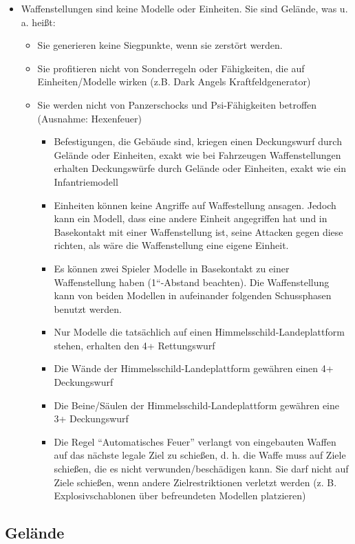 \begin{itemize}
\item Waffenstellungen sind keine Modelle oder Einheiten. Sie sind Gelände, was
 u. a.  heißt:
\begin{itemize}
 \item Sie generieren keine Siegpunkte, wenn sie zerstört werden.
 \item Sie profitieren nicht von Sonderregeln oder Fähigkeiten, die auf
  Einheiten/Modelle wirken (z.B. Dark Angels Kraftfeldgenerator)
 \item Sie werden nicht von Panzerschocks und Psi-Fähigkeiten betroffen
  (Ausnahme: Hexenfeuer)
\begin{itemize}
 \item Befestigungen, die Gebäude sind, kriegen einen Deckungswurf durch Gelände
  oder Einheiten, exakt wie bei Fahrzeugen
Waffenstellungen erhalten Deckungswürfe durch Gelände oder Einheiten, exakt wie
ein Infantriemodell
\item Einheiten können keine Angriffe auf Waffestellung ansagen. Jedoch kann ein
 Modell, dass eine andere Einheit angegriffen hat und in Basekontakt mit einer
 Waffenstellung ist, seine Attacken gegen diese richten, als wäre die
 Waffenstellung eine eigene Einheit.
\item Es können zwei Spieler Modelle in Basekontakt zu einer Waffenstellung
 haben (1“-Abstand beachten). Die Waffenstellung kann von beiden Modellen in
 aufeinander folgenden Schussphasen benutzt werden.
\item Nur Modelle die tatsächlich auf einen Himmelsschild-Landeplattform stehen,
 erhalten den 4+ Rettungswurf
\item Die Wände der Himmelsschild-Landeplattform gewähren einen 4+ Deckungswurf
\item Die Beine/Säulen der Himmelsschild-Landeplattform gewähren eine 3+
 Deckungswurf
 \item Die Regel ``Automatisches Feuer'' verlangt von eingebauten Waffen auf das
  nächste legale Ziel zu schießen, d. h. die Waffe muss  auf Ziele schießen, die
  es nicht verwunden/beschädigen kann. Sie darf nicht auf Ziele schießen, wenn
  andere Zielrestriktionen verletzt werden (z. B. Explosivschablonen über
  befreundeten Modellen platzieren)
\end{itemize}
\end{itemize}
\end{itemize}

\newpage

\subsection{Gelände}


